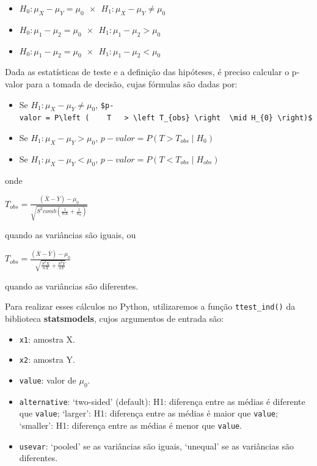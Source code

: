 \documentclass[
  letterpaper,
  DIV=11,
  numbers=noendperiod]{scrreprt}
\providecommand{\tightlist}{%
  \setlength{\itemsep}{0pt}\setlength{\parskip}{0pt}}\usepackage{longtable,booktabs,array}
\begin{document}
\begin{itemize}
\tightlist
\item
  \(H_{0}: \mu_{X} - \mu_{Y} = \mu_{0} \ \ \times \ \ H_{1}: \mu_{X} - \mu_{Y} \neq \mu_{0}\)
\item
  \(H_{0}: \mu_{1} - \mu_{2} = \mu_{0} \ \ \times \ \ H_{1}: \mu_{1} - \mu_{2} > \mu_{0}\)
\item
  \(H_{0}: \mu_{1} - \mu_{2} = \mu_{0} \ \ \times \ \ H_{1}: \mu_{1} - \mu_{2} < \mu_{0}\)
\end{itemize}

Dada as estatísticas de teste e a definição das hipóteses, é preciso
calcular o p-valor para a tomada de decisão, cujas fórmulas são dadas
por:

\begin{itemize}
\item
  Se \(H_{1}: \mu_{X} - \mu_{Y} \neq \mu_{0}\),
  \texttt{\$p-valor\ =\ P\textbackslash{}left\ (\ \ \ \ T\ \ \ \textgreater{}\ \textbackslash{}left\ T\_\{obs\}\ \textbackslash{}right\ \ \textbackslash{}mid\ H\_\{0\}\ \textbackslash{}right)\$}
\item
  Se \(H_{1}: \mu_{X} - \mu_{Y} > \mu_{0}\),
  \(p-valor = P\left ( T > T_{obs} \mid H_{0}\right )\)
\item
  Se \(H_{1}: \mu_{X} - \mu_{Y} < \mu_{0}\),
  \(p-valor = P\left ( T < T_{obs} \mid H_{obs} \right )\)
\end{itemize}

onde

\(T_{obs} = \frac{ (\bar{X} - \bar{Y}) - \mu_{0} }{ \sqrt{S^2{comb} \left ( \frac{1}{n{X}} + \frac{1}{n_{Y}} \right ) } }\)

quando as variâncias são iguais, ou

\(T_{obs} = \frac{ (\bar{X} - \bar{Y}) - \mu_{0} }{ \sqrt{ \frac{S^2{X}}{n{X}} + \frac{S^2{Y}}{n{Y}} } }\)

quando as variâncias são diferentes.

Para realizar esses cálculos no Python, utilizaremos a função
\texttt{ttest\_ind()} da biblioteca \textbf{statsmodels}, cujos
argumentos de entrada são:

\begin{itemize}
\tightlist
\item
  \texttt{x1}: amostra X.
\item
  \texttt{x2}: amostra Y.
\item
  \texttt{value}: valor de \({\mu_{0}}\).
\item
  \texttt{alternative}: `two-sided' (default): H1: diferença entre as
  médias é diferente que \texttt{value}; `larger': H1: diferença entre
  as médias é maior que \texttt{value}; `smaller': H1: diferença entre
  as médias é menor que \texttt{value}.
\item
  \texttt{usevar}: `pooled' se as variâncias são iguais, `unequal' se as
  variâncias são diferentes.
\end{itemize}
\end{document}
